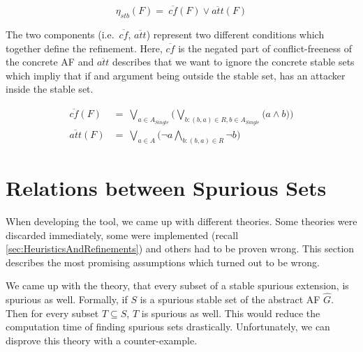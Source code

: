 $$
\eta_{stb}(F) =\ \overline{cf}(F) \lor \overline{att}(F)
$$


The two components (i.e.\ $\overline{cf}$, $\overline{att}$) represent two different conditions which together define the refinement. Here, $\overline{cf}$ is the negated part of conflict-freeness of the concrete AF and $\overline{att}$ describes that we want to ignore the concrete stable sets which impliy that if and argument being outside the stable set, has an attacker inside the stable set.

\begin{align*}
    \overline{cf}(F)&=\ \bigvee_{a \in A_{\mathit{Single}}} \big( \bigvee_{b:(b,a)\in R, b \in A_{\mathit{Single}}} \big( a \land b \big) \big)\\[0.2cm]
    \overline{att}(F)&=\ \bigvee_{a \in A} \big( \lnot a \bigwedge_{b:(b,a)\in R} \lnot b \big)
\end{align*}


\section{Relations between Spurious Sets }
\label{sec:AlgorithmsRelationsBetweenSpuriousSets}

When developing the tool, we came up with different theories. Some theories were discarded immediately, some were implemented (recall \cref{sec:HeuristicsAndRefinements}) and others had to be proven wrong. This section describes the most promising assumptions which turned out to be wrong.

We came up with the theory, that every subset of a stable spurious extension, is spurious as well. Formally, if $S$ is a spurious stable set of the abstract AF $\hat{G}$. Then for every subset $T \subseteq S$, $T$ is spurious as well. This would reduce the computation time of finding spurious sets drastically. Unfortunately, we can disprove this theory with a counter-example.

